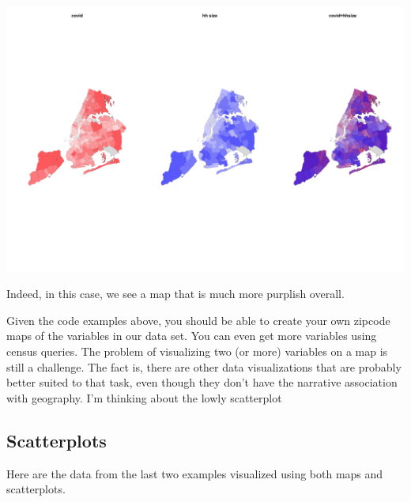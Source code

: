 \documentclass[
  openany]{book}
\begin{document}
\begin{center}\includegraphics[width=0.9\linewidth]{carpedatum_files/figure-html/unnamed-chunk-97-1} \end{center}

Indeed, in this case, we see a map that is much more purplish overall.

Given the code examples above, you should be able to create your own zipcode maps of the variables in our data set. You can even get more variables using census queries. The problem of visualizing two (or more) variables on a map is still a challenge. The fact is, there are other data visualizations that are probably better suited to that task, even though they don't have the narrative association with geography. I'm thinking about the lowly scatterplot

\hypertarget{scatterplots}{%
\subsection*{Scatterplots}\label{scatterplots}}

Here are the data from the last two examples visualized using both maps and scatterplots.
\end{document}
